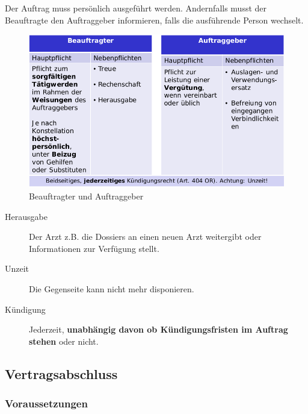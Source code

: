 Der Auftrag muss persönlich ausgeführt werden. Andernfalls musst der
Beauftragte den Auftraggeber informieren, falls die ausführende Person
wechselt.

\begin{figure}[H]
	\centering
	\includegraphics[width=.9\textwidth]{figures/auftraggeberBeauftragter.png}
	\caption{Beauftragter und Auftraggeber}
\end{figure}

\begin{description}
	\item[Herausgabe] Der Arzt z.B. die Dossiers an
	einen neuen Arzt weitergibt oder Informationen zur Verfügung stellt.
	\item[Unzeit] Die Gegenseite kann nicht mehr disponieren.
	\item[Kündigung] Jederzeit, \textbf{unabhängig davon ob Kündigungsfristen
	im Auftrag stehen} oder nicht.
\end{description}


\subsection{Vertragsabschluss}

\subsubsection{Voraussetzungen}

